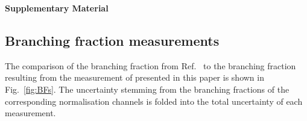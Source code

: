 

\appendix

% 


\clearpage
\renewcommand{\thefigure}{S\arabic{figure}}
\renewcommand{\thetable}{S\arabic{table}}
\renewcommand{\theequation}{S\arabic{equation}}

\setcounter{equation}{0}
\setcounter{figure}{0}
\setcounter{table}{0}
\setcounter{page}{1}

{\noindent\normalfont\bfseries\Large Supplementary Material}\\


\subsection*{Branching fraction measurements}

The comparison of the \BuKmm branching fraction from Ref.~\cite{LHCb-PAPER-2014-006} to the \BuKee branching fraction resulting from the measurement of \RK presented in this paper is shown in Fig.~\ref{fig:BFs}. The uncertainty stemming from the branching fractions of the corresponding normalisation channels is folded into the total uncertainty of each measurement.

